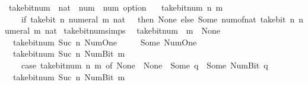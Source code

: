\begin{isabellebody}
\endisatagproof
{\isafoldproof}%
%
\isadelimproof
\isanewline
%
\endisadelimproof
\isanewline
{}\isamarkupfalse%
\ take{\isacharunderscore}{\kern0pt}bit{\isacharunderscore}{\kern0pt}num\ {\isacharcolon}{\kern0pt}{\isacharcolon}{\kern0pt}\ {\isacartoucheopen}nat\ {\isasymRightarrow}\ num\ {\isasymRightarrow}\ num\ option{\isacartoucheclose}\isanewline
\ \ \ {\isacartoucheopen}take{\isacharunderscore}{\kern0pt}bit{\isacharunderscore}{\kern0pt}num\ n\ m\ {\isacharequal}{\kern0pt}\isanewline
\ \ \ \ {\isacharparenleft}{\kern0pt}if\ take{\isacharunderscore}{\kern0pt}bit\ n\ {\isacharparenleft}{\kern0pt}numeral\ m\ {\isacharcolon}{\kern0pt}{\isacharcolon}{\kern0pt}nat{\isacharparenright}{\kern0pt}\ {\isacharequal}{\kern0pt}\ {}\ then\ None\ else\ Some\ {\isacharparenleft}{\kern0pt}num{\isacharunderscore}{\kern0pt}of{\isacharunderscore}{\kern0pt}nat\ {\isacharparenleft}{\kern0pt}take{\isacharunderscore}{\kern0pt}bit\ n\ {\isacharparenleft}{\kern0pt}numeral\ m\ {\isacharcolon}{\kern0pt}{\isacharcolon}{\kern0pt}nat{\isacharparenright}{\kern0pt}{\isacharparenright}{\kern0pt}{\isacharparenright}{\kern0pt}{\isacharparenright}{\kern0pt}{\isacartoucheclose}\isanewline
\isanewline
{}\isamarkupfalse%
\ take{\isacharunderscore}{\kern0pt}bit{\isacharunderscore}{\kern0pt}num{\isacharunderscore}{\kern0pt}simps{\isacharcolon}{\kern0pt}\isanewline
\ \ {\isacartoucheopen}take{\isacharunderscore}{\kern0pt}bit{\isacharunderscore}{\kern0pt}num\ {}\ m\ {\isacharequal}{\kern0pt}\ None{\isacartoucheclose}\isanewline
\ \ {\isacartoucheopen}take{\isacharunderscore}{\kern0pt}bit{\isacharunderscore}{\kern0pt}num\ {\isacharparenleft}{\kern0pt}Suc\ n{\isacharparenright}{\kern0pt}\ Num{\isachardot}{\kern0pt}One\ {\isacharequal}{\kern0pt}\isanewline
\ \ \ \ Some\ Num{\isachardot}{\kern0pt}One{\isacartoucheclose}\isanewline
\ \ {\isacartoucheopen}take{\isacharunderscore}{\kern0pt}bit{\isacharunderscore}{\kern0pt}num\ {\isacharparenleft}{\kern0pt}Suc\ n{\isacharparenright}{\kern0pt}\ {\isacharparenleft}{\kern0pt}Num{\isachardot}{\kern0pt}Bit{}\ m{\isacharparenright}{\kern0pt}\ {\isacharequal}{\kern0pt}\isanewline
\ \ \ \ {\isacharparenleft}{\kern0pt}case\ take{\isacharunderscore}{\kern0pt}bit{\isacharunderscore}{\kern0pt}num\ n\ m\ of\ None\ {\isasymRightarrow}\ None\ {\isacharbar}{\kern0pt}\ Some\ q\ {\isasymRightarrow}\ Some\ {\isacharparenleft}{\kern0pt}Num{\isachardot}{\kern0pt}Bit{}\ q{\isacharparenright}{\kern0pt}{\isacharparenright}{\kern0pt}{\isacartoucheclose}\isanewline
\ \ {\isacartoucheopen}take{\isacharunderscore}{\kern0pt}bit{\isacharunderscore}{\kern0pt}num\ {\isacharparenleft}{\kern0pt}Suc\ n{\isacharparenright}{\kern0pt}\ {\isacharparenleft}{\kern0pt}Num{\isachardot}{\kern0pt}Bit{}\ m{\isacharparenright}{\kern0pt}\ {\isacharequal}{\kern0pt}\isanewline

\end{isabellebody}
